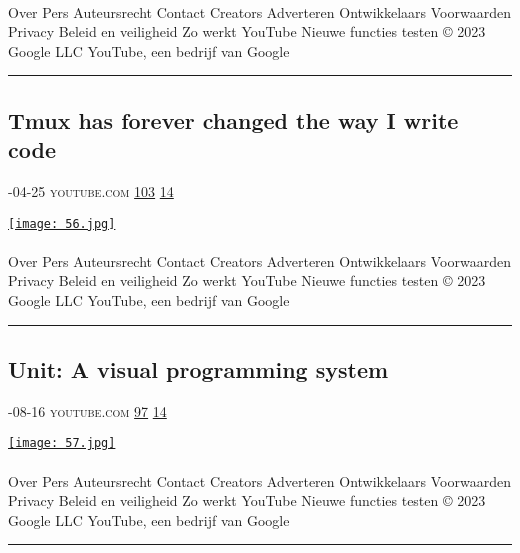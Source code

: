 \documentclass[10pt,a4paper]{article}
\begin{document}
\begin{multicols}{2}
\paragraph{}
Over
Pers
Auteursrecht
Contact
Creators
Adverteren
Ontwikkelaars
Voorwaarden
Privacy
Beleid en veiligheid
Zo werkt YouTube
Nieuwe functies testen
© 2023 Google LLC
YouTube, een bedrijf van Google
\par\noindent\textcolor{red}{\rule{\linewidth}{0.2mm}}
\vfill
\null
\noindent\begin{minipage}{\linewidth}
\subsection{Tmux has forever changed the way I write code}
\textsc{\footnotesize
{\scriptsize\faCalendar}-04-25 
{\scriptsize\faYoutube}\space 
youtube.com 
{\scriptsize\faThumbsOUp}\space 
\href{http://news.ycombinator.com/item?id=37172711\&utm\_term=comment}{103} 
{\scriptsize\faComments}\space 
\href{http://news.ycombinator.com/item?id=37172711\&utm\_term=comment}{14} 
}
\par\medskip\noindent
\href{https://www.youtube.com/watch?v=DzNmUNvnB04\&utm\_source=hackernewsletter\&utm\_medium=email\&utm\_term=watching}{
    \texttt{[image: 56.jpg]}
}
\end{minipage}
\paragraph{}
Over
Pers
Auteursrecht
Contact
Creators
Adverteren
Ontwikkelaars
Voorwaarden
Privacy
Beleid en veiligheid
Zo werkt YouTube
Nieuwe functies testen
© 2023 Google LLC
YouTube, een bedrijf van Google
\par\noindent\textcolor{red}{\rule{\linewidth}{0.2mm}}
\vfill
\null
\noindent\begin{minipage}{\linewidth}
\subsection{Unit: A visual programming system}
\textsc{\footnotesize
{\scriptsize\faCalendar}-08-16 
{\scriptsize\faYoutube}\space 
youtube.com 
{\scriptsize\faThumbsOUp}\space 
\href{http://news.ycombinator.com/item?id=37156337\&utm\_term=comment}{97} 
{\scriptsize\faComments}\space 
\href{http://news.ycombinator.com/item?id=37156337\&utm\_term=comment}{14} 
}
\par\medskip\noindent
\href{https://www.youtube.com/watch?v=lvvzolKHt2E\&utm\_source=hackernewsletter\&utm\_medium=email\&utm\_term=watching}{
    \texttt{[image: 57.jpg]}
}
\end{minipage}
\paragraph{}
Over
Pers
Auteursrecht
Contact
Creators
Adverteren
Ontwikkelaars
Voorwaarden
Privacy
Beleid en veiligheid
Zo werkt YouTube
Nieuwe functies testen
© 2023 Google LLC
YouTube, een bedrijf van Google
\par\noindent\textcolor{red}{\rule{\linewidth}{0.2mm}}
\vfill
\null
\end{multicols}
\end{document}

